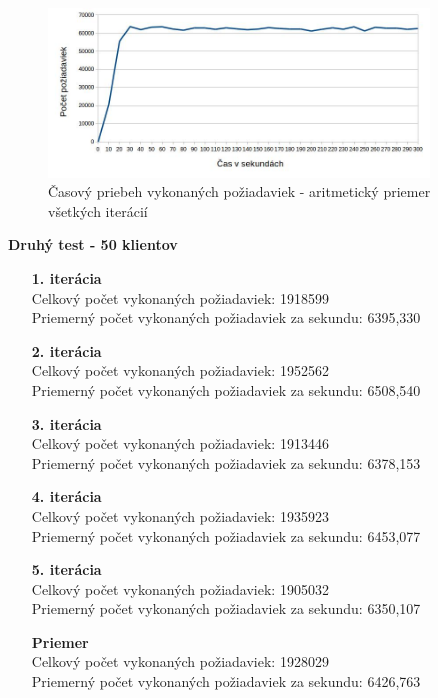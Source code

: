 \documentclass[12pt,oneside,final]{fithesis-utf8}
\begin{document}
\begin{itemize}
\begin{figure}[H]
  \centering
      \includegraphics[width=0.9\textwidth]{gatling2_1_distr.jpg}
  \caption{Časový priebeh vykonaných požiadaviek - aritmetický priemer všetkých iterácií}
\end{figure}

\textbf{Druhý test - 50 klientov}
\begin{itemize}

\item[\textbf{1. iterácia}]\ \\
Celkový počet vykonaných požiadaviek: 1918599\\
Priemerný počet vykonaných požiadaviek za sekundu: 6395,330

\item[\textbf{2. iterácia}]\ \\
Celkový počet vykonaných požiadaviek: 1952562\\
Priemerný počet vykonaných požiadaviek za sekundu: 6508,540

\item[\textbf{3. iterácia}]\ \\
Celkový počet vykonaných požiadaviek: 1913446\\
Priemerný počet vykonaných požiadaviek za sekundu: 6378,153

\item[\textbf{4. iterácia}]\ \\
Celkový počet vykonaných požiadaviek: 1935923\\
Priemerný počet vykonaných požiadaviek za sekundu: 6453,077

\item[\textbf{5. iterácia}]\ \\
Celkový počet vykonaných požiadaviek: 1905032\\
Priemerný počet vykonaných požiadaviek za sekundu: 6350,107

\item[\textbf{Priemer}]\ \\
Celkový počet vykonaných požiadaviek: 1928029\\
Priemerný počet vykonaných požiadaviek za sekundu: 6426,763


\end{itemize}
\end{itemize}
\end{document}
